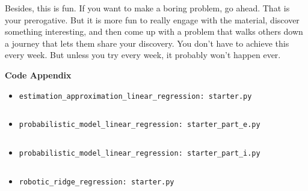 \documentclass{article}\usepackage[utf8]{inputenc}\usepackage[margin=0.4cm,top=0.4cm,bottom=0.4cm]{geometry}\usepackage[usenames,dvipsnames,svgnames,table]{xcolor}
\begin{document}
\noindent Besides, this is fun. If you want to make a boring problem, go ahead. That is your prerogative. But it is more fun to really engage with the material, discover something interesting, and then come up with a problem that walks others down a journey that lets them share your discovery. You don't have to achieve this every week. But unless you try every week, it probably won't happen ever. 
\BeginSolution

\EndSolution
\clearpage

\vspace{-2mm}\noindent\begin{mybox}{\begin{center}\textbf{\color{black}Code Appendix}\end{center}}\end{mybox}\vspace{-2mm}
\begin{itemize}
\item \texttt{estimation\_approximation\_linear\_regression: starter.py}
\BeginSolution
\begin{verbatim}

\end{verbatim}
\EndSolution
\item \texttt{probabilistic\_model\_linear\_regression: starter\_part\_e.py}
\BeginSolution
\begin{verbatim}

\end{verbatim}
\EndSolution
\item \texttt{probabilistic\_model\_linear\_regression: starter\_part\_i.py}
\BeginSolution
\begin{verbatim}

\end{verbatim}
\EndSolution
\item \texttt{robotic\_ridge\_regression: starter.py}
\BeginSolution
\begin{verbatim}

\end{verbatim}
\EndSolution
\end{itemize}
\end{document}
